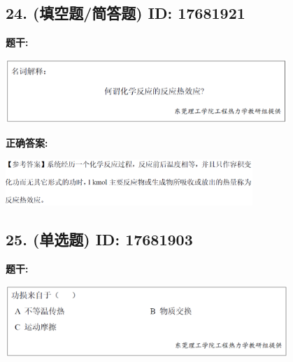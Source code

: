 \documentclass[12pt]{article}
\begin{document}
\vspace{0.5em}\hrulefill\vspace{1em}

\subsection*{24. (填空题/简答题) \small ID: 17681921}

\textbf{题干:}


\begin{center}\includegraphics[width=0.8\textwidth, height=0.25\textheight, keepaspectratio]{question_24_17681921/title_img_1.png}\end{center}

\textbf{正确答案:}

\begin{center}\includegraphics[width=0.7\textwidth, height=0.2\textheight, keepaspectratio]{question_24_17681921/correct_answer_1_img_1.png}\end{center}

\vspace{0.5em}\hrulefill\vspace{1em}

\subsection*{25. (单选题) \small ID: 17681903}

\textbf{题干:}


\begin{center}\includegraphics[width=0.8\textwidth, height=0.25\textheight, keepaspectratio]{question_25_17681903/title_img_1.png}\end{center}
\end{document}
